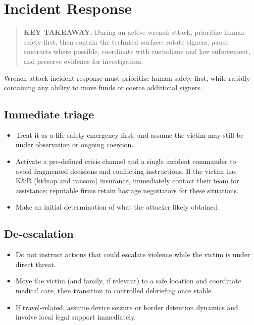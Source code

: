 \chapter{Incident Response}\label{incident-response}

\begin{quote}
\textbf{KEY TAKEAWAY.} During an active wrench attack, prioritize human safety first, then contain the technical surface: rotate signers, pause contracts where possible, coordinate with custodians and law enforcement, and preserve evidence for investigation.
\end{quote}

Wrench-attack incident response must prioritize human safety first, while rapidly containing any ability to move funds or coerce additional signers.

\section{Immediate triage}\label{immediate-triage}

\begin{itemize}
\tightlist
\item
  Treat it as a life-safety emergency first, and assume the victim may still be under observation or ongoing coercion.
\item
  Activate a pre-defined crisis channel and a single incident commander to avoid fragmented decisions and conflicting instructions. If the victim has K\&R (kidnap and ransom) insurance, immediately contact their team for assistance; reputable firms retain hostage negotiators for these situations.
\item
  Make an initial determination of what the attacker likely obtained.
\end{itemize}

\section{De-escalation}\label{de-escalation}

\begin{itemize}
\tightlist
\item
  Do not instruct actions that could escalate violence while the victim is under direct threat.
\item
  Move the victim (and family, if relevant) to a safe location and coordinate medical care, then transition to controlled debriefing once stable.
\item
  If travel-related, assume device seizure or border detention dynamics and involve local legal support immediately.
\end{itemize}

